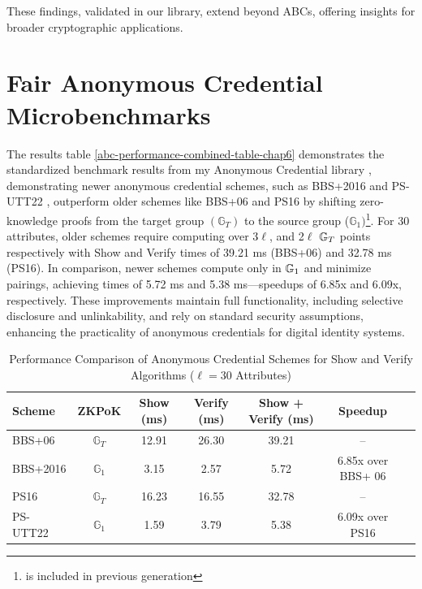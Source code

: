 These findings, validated in our library, extend beyond ABCs, offering insights for broader cryptographic applications.



\section{Fair Anonymous Credential Microbenchmarks}

The results table \ref{abc-performance-combined-table-chap6} demonstrates the standardized benchmark results from my Anonymous Credential library \cite{polgar_anonymous_2025}, demonstrating newer anonymous credential schemes, such as BBS+2016 \cite{camenisch_anonymous_2016} and PS-UTT22 \cite{tomescu_utt_2022}, outperform older schemes like BBS+06 \cite{hutchison_constant-size_2006} and PS16 \cite{sako_short_2016} by shifting zero-knowledge proofs from the target group $(\mathbb{G}_T)$ to the source group ($\mathbb{G}_1)$\footnote{\cite{hutchison_signature_2004} is included in previous generation}. For 30 attributes, older schemes require computing over 3$\ell$, and 2$\ell$ $\mathbb{G}_T$ points respectively with Show and Verify times of 39.21 ms (BBS+06) and 32.78 ms (PS16). In comparison, newer schemes compute only in $\mathbb{G}_1$ and minimize pairings, achieving times of 5.72 ms and 5.38 ms—speedups of 6.85x and 6.09x, respectively. These improvements maintain full functionality, including selective disclosure and unlinkability, and rely on standard security assumptions, enhancing the practicality of anonymous credentials for digital identity systems.



\begin{table}[!htbp]
\centering
\caption{Performance Comparison of Anonymous Credential Schemes for Show and Verify Algorithms ($\ell = 30$ Attributes)}
\label{tab:anon_creds_performance_old_gen_vs_new}
\begin{tabular}{|l|c|c|c|c|c|c|}
\hline
\textbf{Scheme} & \textbf{ZKPoK}  & \textbf{Show (ms)} & \textbf{Verify (ms)}  & \textbf{Show + Verify (ms)} & \textbf{Speedup} \\
\hline
BBS+06 & $\mathbb{G}_T$ & 12.91  & 26.30 & 39.21 & -- \\
\hline
BBS+2016 & $\mathbb{G}_1$ & 3.15  & 2.57 & 5.72 & 6.85x over BBS+ 06 \\
\hline
PS16 & $\mathbb{G}_T$ & 16.23  & 16.55 & 32.78 & -- \\
\hline
PS-UTT22 & $\mathbb{G}_1$ & 1.59  & 3.79 & 5.38 & 6.09x over PS16 \\
\hline
\end{tabular}
\end{table}












